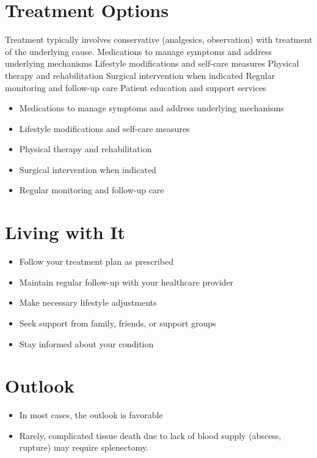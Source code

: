 \section{Treatment Options}
Treatment typically involves conservative (analgesics, observation) with treatment of the underlying cause. Medications to manage symptoms and address underlying mechanisms Lifestyle modifications and self-care measures Physical therapy and rehabilitation Surgical intervention when indicated Regular monitoring and follow-up care Patient education and support services

\begin{itemize}[noitemsep]
  \item Medications to manage symptoms and address underlying mechanisms
  \item Lifestyle modifications and self-care measures
  \item Physical therapy and rehabilitation
  \item Surgical intervention when indicated
  \item Regular monitoring and follow-up care
\end{itemize}
\section{Living with It}
\begin{itemize}[noitemsep]
  \item Follow your treatment plan as prescribed
  \item Maintain regular follow-up with your healthcare provider
  \item Make necessary lifestyle adjustments
  \item Seek support from family, friends, or support groups
  \item Stay informed about your condition
\end{itemize}
\section{Outlook}
\begin{itemize}[noitemsep]
  \item In most cases, the outlook is favorable
  \item Rarely, complicated tissue death due to lack of blood supply (abscess, rupture) may require splenectomy.
\end{itemize}
